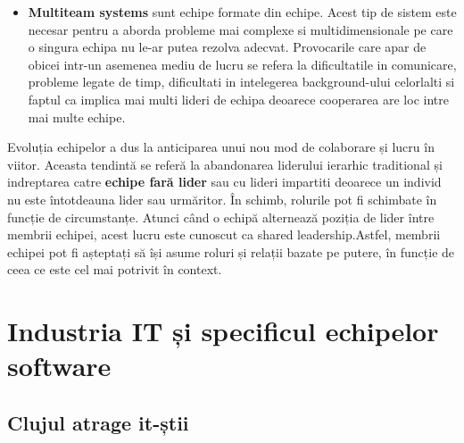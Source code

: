 \documentclass[a4paper, 12pt]{article}
\begin{document}
\begin{itemize}
	\item \textbf{Multiteam systems} sunt echipe formate din echipe. Acest tip de sistem este necesar pentru a aborda probleme mai complexe si multidimensionale pe care o singura echipa nu le-ar putea rezolva adecvat. Provocarile care apar de obicei intr-un asemenea mediu de lucru  se refera la dificultatile in comunicare, probleme legate de timp, dificultati in intelegerea background-ului celorlalti si faptul ca implica mai multi lideri de echipa deoarece cooperarea are loc intre mai multe echipe.
	
\end{itemize}

	\quad\quad Evoluția echipelor a dus la anticiparea unui nou mod de colaborare și lucru în viitor. Aceasta tendintă se referă la abandonarea liderului ierarhic traditional și indreptarea catre \textbf{echipe fară lider} sau cu lideri impartiti deoarece un individ nu este întotdeauna lider sau urmăritor. În schimb, rolurile pot fi schimbate în funcție de circumstanțe. Atunci când o echipă alternează poziția de lider între membrii echipei, acest lucru este cunoscut ca shared leadership.Astfel, membrii echipei pot fi așteptați să își asume roluri și relații bazate pe putere, în funcție de ceea ce este cel mai potrivit în context.

\newpage
	\setcounter{section}{1}

	\section{Industria IT și specificul echipelor software}

	\subsection{Clujul atrage it-știi}
\end{document}
